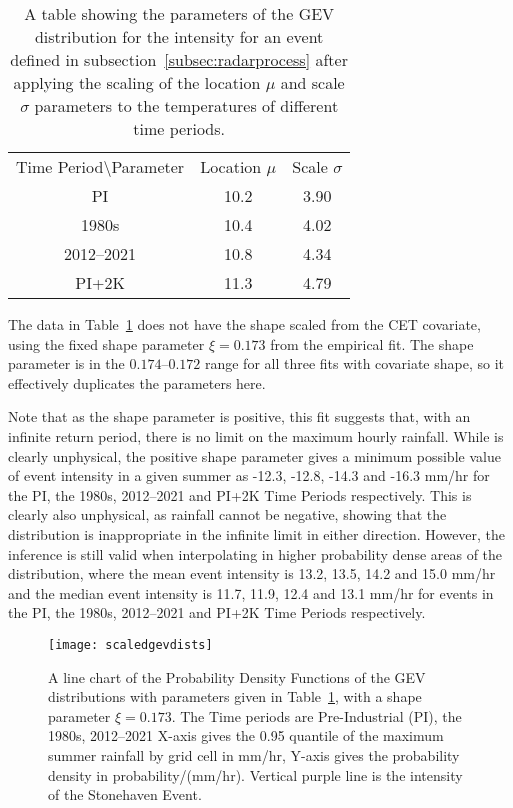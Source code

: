 \begin{table}[H]
    \centering
    \begin{tabular}{c c c}
        Time Period\textbackslash Parameter & Location $\mu$ & Scale $\sigma$ \\
        PI & 10.2 & 3.90 \\
        1980s & 10.4 & 4.02 \\
        2012--2021 & 10.8 & 4.34 \\
        PI+2K & 11.3 & 4.79
    \end{tabular}
    \caption[Parameters of the GEV distribution for the intensity an event.]{
        A table showing the parameters of the GEV distribution for the intensity for an event defined in subsection~\ref{subsec:radarprocess} after
        applying the scaling of the location $\mu$ and scale $\sigma$ parameters to the temperatures of different time periods.}
    \label{tab:0.95params}
\end{table}

The data in Table~\ref{tab:0.95params} does not have the shape scaled from the CET covariate,
    using the fixed shape parameter $\xi = 0.173$ from the empirical fit.
The shape parameter is in the $0.174$--$0.172$ range for all three fits with covariate shape,
    so it effectively duplicates the parameters here.

Note that as the shape parameter is positive,
    this fit suggests that, with an infinite return period, there is no limit on the maximum hourly rainfall.
While is clearly unphysical, the positive shape parameter gives a minimum possible value of event intensity in a given summer as
    -12.3, -12.8, -14.3 and -16.3 mm/hr for the PI, the 1980s, 2012--2021 and PI+2K Time Periods respectively.
This is clearly also unphysical,
    as rainfall cannot be negative,
    showing that the distribution is inappropriate in the infinite limit in either direction.
However,
    the inference is still valid when interpolating in higher probability dense areas of the distribution,
    where the mean event intensity is 13.2, 13.5, 14.2 and 15.0 mm/hr and
    the median event intensity is 11.7, 11.9, 12.4 and 13.1 mm/hr for
    events in the PI, the 1980s, 2012--2021 and PI+2K Time Periods respectively.

\begin{figure}[H]
    \centering
    \texttt{[image: scaledgevdists]}
    \caption[PDFs of the GEV distributions.]{
        A line chart of the Probability Density Functions of the GEV distributions with parameters given in Table~\ref{tab:0.95params},
        with a shape parameter $\xi = 0.173$.
    The Time periods are Pre-Industrial (PI), the 1980s, 2012--2021
    X-axis gives the 0.95 quantile of the maximum summer rainfall by grid cell in mm/hr,
        Y-axis gives the probability density in probability/(mm/hr).
    Vertical purple line is the intensity of the Stonehaven Event.}
    \label{fig:scaledgevdists}
\end{figure}

